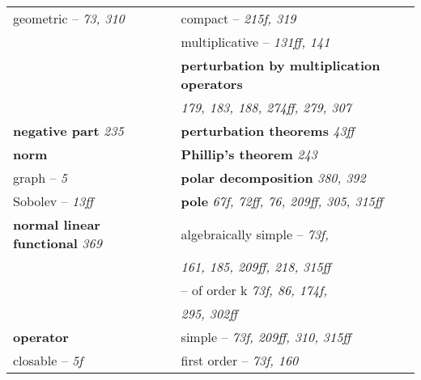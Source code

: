 \documentclass{article}
\begin{document}
\begin{longtable}{p{}p{}}
\quad geometric -- \textit{73, 310} & \quad compact -- \textit{215f, 319} \\
& \quad multiplicative -- \textit{131ff, 141} \\
& \textbf{perturbation by multiplication operators} \\
& \quad \textit{179, 183, 188, 274ff, 279, 307} \\
\textbf{negative part} \textit{235} & \textbf{perturbation theorems} \textit{43ff} \\
\textbf{norm} & \textbf{Phillip's theorem} \textit{243} \\
\quad graph -- \textit{5} & \textbf{polar decomposition} \textit{380, 392} \\
\quad Sobolev -- \textit{13ff} & \textbf{pole} \textit{67f, 72ff, 76, 209ff, 305, 315ff} \\
\textbf{normal linear functional} \textit{369} & \quad algebraically simple -- \textit{73f,} \\
& \quad\quad \textit{161, 185, 209ff, 218, 315ff} \\
& \quad -- of order k \textit{73f, 86, 174f,} \\
& \quad\quad \textit{295, 302ff} \\
\textbf{operator} & \quad simple -- \textit{73f, 209ff, 310, 315ff} \\
\quad closable -- \textit{5f} & \quad first order -- \textit{73f, 160} \\


\end{longtable}
\end{document}
